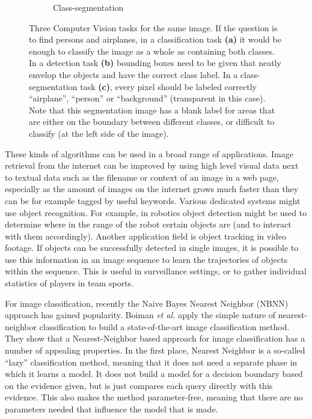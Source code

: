 \begin{figure}[hbt]
\begin{subfigure}[b]{0.3\textwidth}
            \caption{Class-segmentation}
            \label{fig:segmentation}
            \end{subfigure}
    \caption{Three Computer Vision tasks for the same image. If the question is to find persons and airplanes, in a classification task \textbf{(a)} it would be enough to classify the image as a whole as containing both classes. In a detection task \textbf{(b)} bounding boxes need to be given that neatly envelop the objects and have the correct class label. In a class-segmentation task \textbf{(c)}, every pixel should be labeled correctly ``airplane'', ``person'' or ``background'' (transparent in this case). Note that this segmentation image has a blank label for areas that are either on the boundary between different classes, or difficult to classify (at the left side of the image). \cite{pascal-voc-2007}}
    \label{fig:clsdetseg}
\end{figure}

These kinds of algorithms can be used in a broad range of applications. Image retrieval from the internet can be improved by using high level visual data next to textual data such as the filename or context of an image in a web page, especially as the amount of images on the internet grows much faster than they can be for example tagged by useful keywords. Various dedicated systems might use object recognition. For example, in robotics object detection might be used to determine where in the range of the robot certain objects are (and to interact with them accordingly). Another application field is object tracking in video footage. If objects can be successfully detected in single images, it is possible to use this information in an image sequence to learn the trajectories of objects within the sequence. This is useful in surveillance settings, or to gather individual statistics of players in team sports. \cite{benfold2011stable, ekin2003automatic, lipton1998moving}

For image classification, recently the Naive Bayes Nearest Neighbor (NBNN) \cite{boiman2008defense} approach has gained popularity. \cite{becker2012codebook, behmo2010towards, mccann2012local, timofte2012iterative, tuytelaars2011nbnn, wang2011improved, zhang2010random} Boiman \emph{et al.} apply the simple nature of nearest-neighbor classification to build a state-of-the-art image classification method. They show that a Nearest-Neighbor based approach for image classification has a number of appealing properties. In the first place, Nearest Neighbor is a so-called ``lazy'' classification method, meaning that it does not need a separate phase in which it learns a model. It does not build a model for a decision boundary based on the evidence given, but is just compares each query directly with this evidence. This also makes the method parameter-free, meaning that there are no parameters needed that influence the model that is made.

